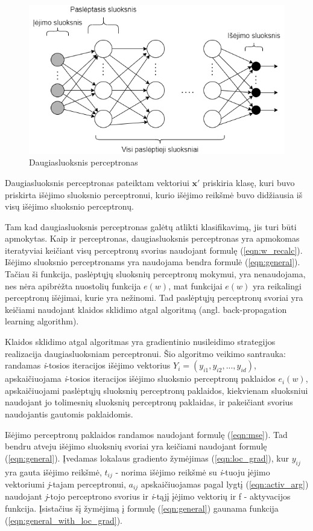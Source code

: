 \begin{figure}[H]
	\centering
	\includegraphics[scale=0.5]{img/neural_network.png}
	\caption{Daugiasluoksnis perceptronas}
	\label{img:nn}
\end{figure}

Daugiasluoksnis perceptronas pateiktam vektoriui $\boldsymbol{x}'$ priskiria klasę, kuri buvo priskirta išėjimo sluoksnio perceptronui, kurio išėjimo reikšmė buvo didžiausia iš visų išėjimo sluoksnio perceptronų.

Tam kad daugiasluoksnis perceptronas galėtų atlikti klasifikavimą, jis turi būti apmokytas. Kaip ir perceptronas, daugiasluoksnis perceptronas yra apmokomas iteratyviai keičiant visų perceptronų svorius naudojant formulę (\ref{eqn:w_recalc}). Išėjimo sluoksnio perceptronams yra naudojama bendra formulė (\ref{eqn:general}). Tačiau ši funkcija, paslėptųjų sluoksnių perceptronų mokymui, yra nenaudojama, nes nėra apibrėžta nuostolių funkcija $e(w)$, mat funkcijai $e(w)$ yra reikalingi perceptronų išėjimai, kurie yra nežinomi. Tad paslėptųjų perceptronų svoriai yra keičiami naudojant klaidos sklidimo atgal algoritmą (angl. back-propagation learning algorithm).

Klaidos sklidimo atgal algoritmas yra gradientinio nusileidimo strategijos realizacija daugiasluoksniam perceptronui. Šio algoritmo veikimo santrauka: randamas \textit{i}-tosios iteracijos išėjimo vektorius $Y_i = (y_{i1}, y_{i2}, ..., y_{id})$, apskaičiuojama \textit{i}-tosios iteracijos išėjimo sluoksnio perceptronų paklaidos $e_i(w)$, apskaičiuojami paslėptųjų sluoksnių perceptronų paklaidos, kiekvienam sluoksniui naudojant jo tolimesnių sluoksnių perceptronų paklaidas, ir pakeičiant svorius naudojantis gautomis paklaidomis.

Išėjimo perceptronų paklaidos randamos naudojant formulę (\ref{eqn:mse}). Tad bendru atveju išėjimo sluoksnių svoriai yra keičiami naudojant formulę (\ref{eqn:general}). Įvedamas lokalaus gradiento žymėjimas (\ref{eqn:loc_grad}), kur $y_{ij}$ yra gauta išėjimo reikšmė, $t_{ij}$ - norima išėjimo reikšmė su \textit{i}-tuoju įėjimo vektoriumi \textit{j}-tajam perceptronui, $a_{ij}$ apskaičiuojamas pagal lygtį (\ref{eqn:activ_arg}) naudojant \textit{j}-tojo perceptrono svorius ir \textit{i}-tąjį įėjimo vektorių ir f - aktyvacijos funkcija. Įsistačius šį žymėjimą į formulę (\ref{eqn:general}) gaunama funkcija (\ref{eqn:general_with_loc_grad}).

